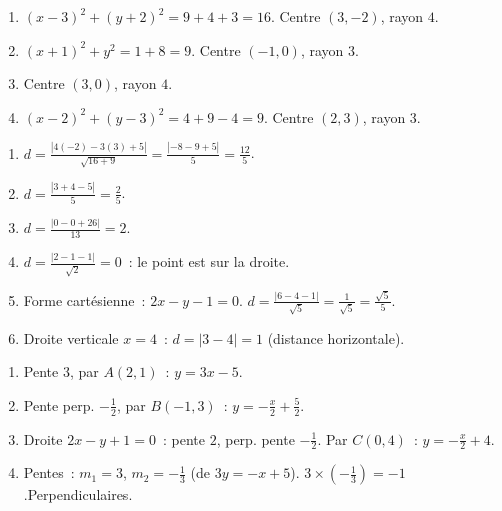 
\begin{enumerate}
  \item $(x-3)^2+(y+2)^2=9+4+3=16$. Centre $(3,-2)$, rayon $4$.
  \item $(x+1)^2+y^2=1+8=9$. Centre $(-1,0)$, rayon $3$.
  \item Centre $(3,0)$, rayon $4$.
  \item $(x-2)^2+(y-3)^2=4+9-4=9$. Centre $(2,3)$, rayon $3$.
\end{enumerate}


\begin{enumerate}
  \item $d=\frac{|4(-2)-3(3)+5|}{\sqrt{16+9}}=\frac{|-8-9+5|}{5}=\frac{12}{5}$.
  \item $d=\frac{|3+4-5|}{5}=\frac{2}{5}$.
  \item $d=\frac{|0-0+26|}{13}=2$.
  \item $d=\frac{|2-1-1|}{\sqrt{2}}=0$~: le point est sur la droite.
  \item Forme cart\'esienne~: $2x-y-1=0$. $d=\frac{|6-4-1|}{\sqrt{5}}=\frac{1}{\sqrt{5}}=\frac{\sqrt{5}}{5}$.
  \item Droite verticale $x=4$~: $d=|3-4|=1$ (distance horizontale).
\end{enumerate}


\begin{enumerate}
  \item Pente $3$, par $A(2,1)$~: $y=3x-5$.
  \item Pente perp. $-\frac{1}{2}$, par $B(-1,3)$~: $y=-\frac{x}{2}+\frac{5}{2}$.
  \item Droite $2x-y+1=0$~: pente $2$, perp. pente $-\frac{1}{2}$.
        Par $C(0,4)$~: $y=-\frac{x}{2}+4$.
  \item Pentes~: $m_1=3$, $m_2=-\frac{1}{3}$ (de $3y=-x+5$).
        $3\times(-\frac{1}{3})=-1$.\checkmark\quad Perpendiculaires.
\end{enumerate}


